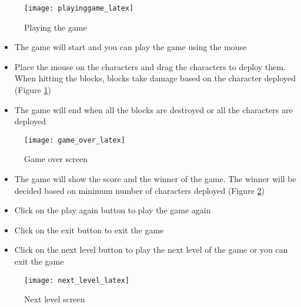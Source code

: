 \documentclass[12pt]{article}
\begin{document}
\begin{figure}[H]
    \centering
    \texttt{[image: playinggame\_latex]}
    \caption{Playing the game}
    \label{fig:playing_game}
\end{figure}

\begin{itemize}
    \item The game will start and you can play the game using the mouse
    \item Place the mouse on the characters and drag the characters to deploy them. When hitting the blocks, blocks take damage based on the character deployed (Figure \ref{fig:playing_game})
    \item The game will end when all the blocks are destroyed or all the characters are deployed
\end{itemize}

\begin{figure}[H]
    \centering
    \texttt{[image: game\_over\_latex]}
    \caption{Game over screen}
    \label{fig:game_over}
\end{figure}

\begin{itemize}
    \item The game will show the score and the winner of the game. The winner will be decided based on minimum number of characters deployed (Figure \ref{fig:game_over})
    \item Click on the play again button to play the game again
    \item Click on the exit button to exit the game
    \item Click on the next level button to play the next level of the game or you can exit the game 
\end{itemize}

\begin{figure}[H]
    \centering
    \texttt{[image: next\_level\_latex]}
    \caption{Next level screen}
    \label{fig:next_level}
\end{figure}
\end{document}
